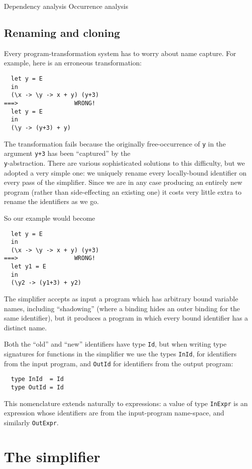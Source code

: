 \documentclass[11pt]{article}
\begin{document}
Dependency analysis
Occurrence analysis

\subsection{Renaming and cloning}

Every program-transformation system has to worry about name capture.
For example, here is an erroneous transformation:
\begin{lstlisting}
  let y = E 
  in
  (\x -> \y -> x + y) (y+3)
===>				WRONG!
  let y = E 
  in
  (\y -> (y+3) + y)
\end{lstlisting}
The transformation fails because the originally free-occurrence
of \texttt{y} in the argument \texttt{y+3} has been ``captured'' by the \texttt{\\y}-abstraction.
There are various sophisticated solutions to this difficulty, but
we adopted a very simple one: we uniquely rename every locally-bound identifier
on every pass of the simplifier.  
Since we are in any case producing an entirely new program (rather than side-effecting
an existing one) it costs very little extra to rename the identifiers as we go.

So our example would become
\begin{lstlisting}
  let y = E 
  in
  (\x -> \y -> x + y) (y+3)
===>				WRONG!
  let y1 = E 
  in
  (\y2 -> (y1+3) + y2)
\end{lstlisting}
The simplifier accepts as input a program which has arbitrary bound
variable names, including ``shadowing'' (where a binding hides an
outer binding for the same identifier), but it produces a program in
which every bound identifier has a distinct name.

Both the ``old'' and ``new'' identifiers have type \texttt{Id}, but when writing 
type signatures for functions in the simplifier we use the types \texttt{InId}, for
identifiers from the input program, and \texttt{OutId} for identifiers from the output program:
\begin{lstlisting}
  type InId  = Id
  type OutId = Id
\end{lstlisting}
This nomenclature extends naturally to expressions: a value of type \texttt{InExpr} is an 
expression whose identifiers are from the input-program name-space, and similarly
\texttt{OutExpr}.


\section{The simplifier}
\end{document}
